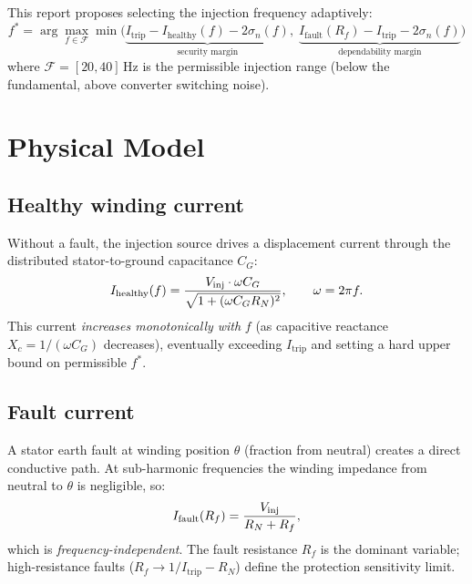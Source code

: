 \documentclass[11pt,a4paper]{article}
\newcommand{\Ihealthy}{I_{\mathrm{healthy}}}
\newcommand{\Ifault}{I_{\mathrm{fault}}}
\newcommand{\Itrip}{I_{\mathrm{trip}}}
\newcommand{\sigman}{\sigma_n}
\newcommand{\fopt}{f^*}
\newcommand{\RN}{R_N}
\newcommand{\CG}{C_G}
\begin{document}
This report proposes selecting the injection frequency adaptively:
\begin{equation}
  \fopt = \arg\max_{f \in \mathcal{F}} \min\bigl(
    \underbrace{\Itrip - \Ihealthy(f) - 2\sigman(f)}_{\text{security margin}},\;
    \underbrace{\Ifault(R_f) - \Itrip - 2\sigman(f)}_{\text{dependability margin}}
  \bigr)
  \label{eq:opt}
\end{equation}
where $\mathcal{F} = [20, 40]$\,Hz is the permissible injection range (below the
fundamental, above converter switching noise).

\section{Physical Model}
\label{sec:model}

\subsection{Healthy winding current}
\label{sec:healthy}

Without a fault, the injection source drives a displacement current through the
distributed stator-to-ground capacitance $\CG$:
\begin{equation}
  \Ihealthy(f) = \frac{V_{\rm inj} \cdot \omega \CG}{\sqrt{1 + (\omega \CG \RN)^2}},
  \qquad \omega = 2\pi f.
  \label{eq:Ihealthy}
\end{equation}
This current \emph{increases monotonically with} $f$ (as capacitive reactance
$X_c = 1/(\omega\CG)$ decreases), eventually exceeding $\Itrip$ and setting a
hard upper bound on permissible $\fopt$.

\subsection{Fault current}
\label{sec:fault}

A stator earth fault at winding position $\theta$ (fraction from neutral)
creates a direct conductive path.  At sub-harmonic frequencies the winding
impedance from neutral to $\theta$ is negligible, so:
\begin{equation}
  \Ifault(R_f) = \frac{V_{\rm inj}}{\RN + R_f},
  \label{eq:Ifault}
\end{equation}
which is \emph{frequency-independent}.  The fault resistance $R_f$ is the
dominant variable; high-resistance faults ($R_f \to 1/\Itrip - \RN$) define the
protection sensitivity limit.
\end{document}
